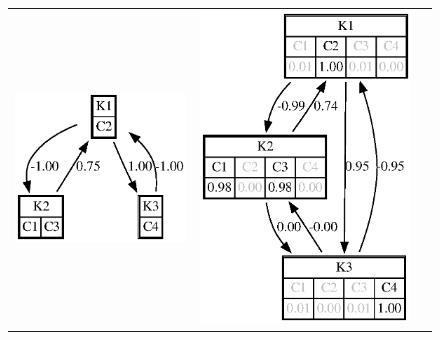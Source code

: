 \documentclass[graybox]{svmult}
\begin{document}
\begin{center}
\begin{figure}
\begin{tabular}{p{}p{}p{}}
      \includegraphics[width=\linewidth]{kClustered.eps} &
      \includegraphics[width=\linewidth]{fClustered.eps} \\

\end{tabular}
\end{figure}
\end{center}
\end{document}
